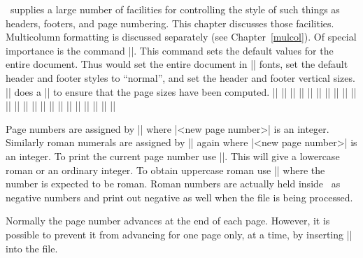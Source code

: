   \relax \fi %

\def\cqu{\cquote{Insanity is often the logic of an accurate mind overtaxed.}{The
Autocrat at the Breakfast Table, Oliver~Wendell~Holmes (1809-1894)}
}

\intex\ supplies a large number of facilities for controlling the style of
such things as headers, footers, and page numbering. This chapter discusses
those facilities. Multicolumn formatting is discussed separately (see 
Chapter~\ref{mulcol}). Of special importance is the command
||. This command sets the default values for the
entire document. Thus 
\begintt
\documentstyle{\twelvepoint
               \normalheaderstyle
               \normalfooterstyle
               \vheadersize=1.5cm
               \vfootersize=2cm}
\endtt
would set the entire document in |\twelvepoint| fonts,  set the default
header and footer styles to ``normal'', and set the header and footer
vertical sizes. |\documentstyle| does a |\setpagesizes| to ensure that the
page sizes have been computed. 
\begintwocolumn
\hfuzz=20pt
\ext|\blankheaderstyle|
\ext|\blankfooterstyle|
\ext|\documentstyle|
\pla|\folio|
\ext|\footerfont|
\ext|\footertext|
\ext|\fullpagestyle|
\ext|\headerfont|
\ext|\headertext|
\ext|\noheaderstyle|
\ext|\nofooterstyle|
\ext|\nopagenumberadvance|
\ext|\normalpagestyle|
\ext|\normalheaderstyle|
\ext|\normalfooterstyle|
\ext|\pagenumber|
\ext|\romanpagenumber|
\ext|\specialfootertext|
\ext|\specialheadertext|
\ext|\specialpagestyle|
\ext|\titlepagestyle|
\ext|\vheadersize|
\ext|\vfootersize|
\endthreecolumn

Page numbers are assigned by || where 
|<new page number>| is an integer. Similarly  roman numerals are assigned
by || again where |<new page number>|
is an integer. To print the current page number use |\folio|. This will
give a lowercase roman or an ordinary integer. To obtain uppercase roman use
|\uppercase{\folio}| where the number is expected to be roman. Roman
numbers are actually held inside \tex\ as negative numbers and print out
negative as well when the file is being processed.

Normally the page number advances at the end of each page. However, it is
possible to prevent it from advancing for one page only, at a time, by
inserting |\nopagenumberadvance| into the file.

